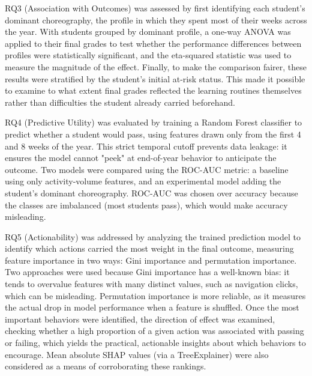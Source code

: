 RQ3 (Association with Outcomes) was assessed by first identifying each student's dominant choreography, the profile in which they spent most of their weeks across the year. With students grouped by dominant profile, a one-way ANOVA was applied to their final grades to test whether the performance differences between profiles were statistically significant, and the eta-squared statistic was used to measure the magnitude of the effect. Finally, to make the comparison fairer, these results were stratified by the student's initial at-risk status. This made it possible to examine to what extent final grades reflected the learning routines themselves rather than difficulties the student already carried beforehand.

RQ4 (Predictive Utility) was evaluated by training a Random Forest classifier to predict whether a student would pass, using features drawn only from the first 4 and 8 weeks of the year. This strict temporal cutoff prevents data leakage: it ensures the model cannot "peek" at end-of-year behavior to anticipate the outcome. Two models were compared using the ROC-AUC metric: a baseline using only activity-volume features, and an experimental model adding the student's dominant choreography. ROC-AUC was chosen over accuracy because the classes are imbalanced (most students pass), which would make accuracy misleading.

RQ5 (Actionability) was addressed by analyzing the trained prediction model to identify which actions carried the most weight in the final outcome, measuring feature importance in two ways: Gini importance and permutation importance. Two approaches were used because Gini importance has a well-known bias: it tends to overvalue features with many distinct values, such as navigation clicks, which can be misleading. Permutation importance is more reliable, as it measures the actual drop in model performance when a feature is shuffled. Once the most important behaviors were identified, the direction of effect was examined, checking whether a high proportion of a given action was associated with passing or failing, which yields the practical, actionable insights about which behaviors to encourage. Mean absolute SHAP values (via a TreeExplainer) were also considered as a means of corroborating these rankings.


